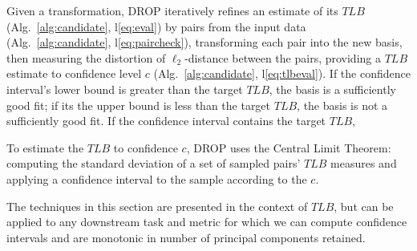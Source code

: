 Given a transformation, DROP iteratively refines an estimate of its $TLB$ (Alg.~\ref{alg:candidate}, l\ref{eq:eval}) by  pairs from the input data (Alg.~\ref{alg:candidate}, l\ref{eq:paircheck}), transforming each pair into the new basis, then measuring the distortion of $\ell_2$-distance between the pairs, providing a $TLB$ estimate to confidence level $c$ (Alg.~\ref{alg:candidate}, l\ref{eq:tlbeval}). 
If the confidence interval's lower bound is greater than the target $TLB$, the basis is a sufficiently good fit; if its the upper bound is less than the target $TLB$, the basis is not a sufficiently good fit. 
If the confidence interval contains the target $TLB$,  

To estimate the $TLB$ to confidence $c$, DROP uses the Central Limit Theorem: computing the standard deviation of a set of sampled pairs' $TLB$ measures and applying a confidence interval to the sample according to the $c$.

The techniques in this section are presented in the context of $TLB$, but can be applied to any downstream task and metric for which we can compute confidence intervals and are monotonic in number of principal components retained.

